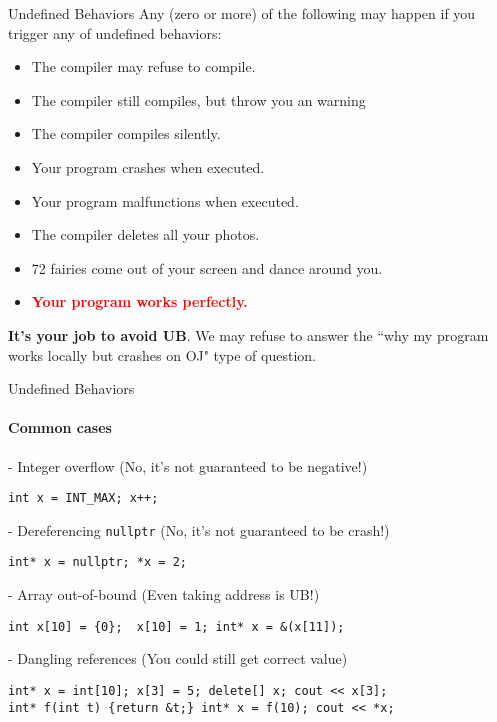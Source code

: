 \begin{frame}{Undefined Behaviors}
Any (zero or more) of the following may happen if you trigger any of undefined behaviors:

\begin{itemize}
	\item The compiler may refuse to compile.
	\item The compiler still compiles, but throw you an warning
	\item The compiler compiles silently.
	\item Your program crashes when executed.
	\item Your program malfunctions when executed.
	\item The compiler deletes all your photos.
	\item 72 fairies come out of your screen and dance around you.
	\item \textbf{\textcolor{red}{Your program works perfectly.}}
\end{itemize} 

\textbf{It's your job to avoid UB}. We may refuse to answer the ``why my program works locally but crashes on OJ" type of question.
\end{frame}

\begin{frame}[fragile]{Undefined Behaviors}
\framesubtitle{Common cases}


- Integer overflow (No, it's not guaranteed to be negative!)
\begin{verbatim}
int x = INT_MAX; x++; 
\end{verbatim}

- Dereferencing \texttt{nullptr} (No, it's not guaranteed to be crash!)
\begin{verbatim}
int* x = nullptr; *x = 2;
\end{verbatim}

- Array out-of-bound (Even taking address is UB!)
\begin{verbatim}
int x[10] = {0};  x[10] = 1; int* x = &(x[11]);
\end{verbatim}



- Dangling references (You could still get correct value)
\begin{verbatim}
int* x = int[10]; x[3] = 5; delete[] x; cout << x[3]; 
int* f(int t) {return &t;} int* x = f(10); cout << *x;
\end{verbatim}


\end{frame}


